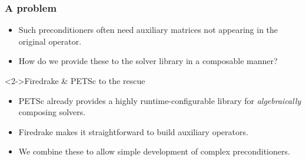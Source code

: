 \documentclass[presentation,aspectratio=43]{beamer}
\begin{document}
\begin{frame}
  \frametitle{A problem}
  \begin{itemize}
  \item Such preconditioners often need auxiliary matrices not
    appearing in the original operator.
  \item How do we provide these to the solver library in a composable
    manner?
  \end{itemize}
  \begin{block}<2->{Firedrake \& PETSc to the rescue}
  \begin{itemize}
  \item PETSc already provides a highly runtime-configurable library
    for \emph{algebraically} composing solvers. \nocite{Brown:2012}

  \item Firedrake makes it straightforward to build auxiliary
    operators.

  \item We combine these to allow simple development of complex
    preconditioners.
  \end{itemize}
  \end{block}
\end{frame}
\end{document}
